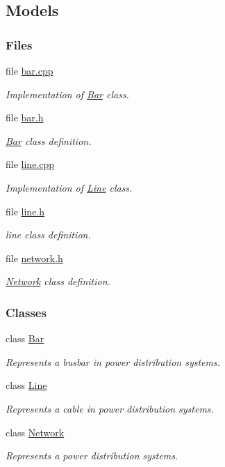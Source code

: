 \hypertarget{group___models}{}\subsection{Models}
\label{group___models}
\subsubsection*{Files}
\begin{DoxyCompactItemize}
\item 
file \hyperlink{bar_8cpp}{bar.\+cpp}
\begin{DoxyCompactList}\small\item\em Implementation of \hyperlink{class_bar}{Bar} class. \end{DoxyCompactList}\item 
file \hyperlink{bar_8h}{bar.\+h}
\begin{DoxyCompactList}\small\item\em \hyperlink{class_bar}{Bar} class definition. \end{DoxyCompactList}\item 
file \hyperlink{line_8cpp}{line.\+cpp}
\begin{DoxyCompactList}\small\item\em Implementation of \hyperlink{class_line}{Line} class. \end{DoxyCompactList}\item 
file \hyperlink{line_8h}{line.\+h}
\begin{DoxyCompactList}\small\item\em line class definition. \end{DoxyCompactList}\item 
file \hyperlink{network_8h}{network.\+h}
\begin{DoxyCompactList}\small\item\em \hyperlink{class_network}{Network} class definition. \end{DoxyCompactList}\end{DoxyCompactItemize}
\subsubsection*{Classes}
\begin{DoxyCompactItemize}
\item 
class \hyperlink{class_bar}{Bar}
\begin{DoxyCompactList}\small\item\em Represents a busbar in power distribution systems. \end{DoxyCompactList}\item 
class \hyperlink{class_line}{Line}
\begin{DoxyCompactList}\small\item\em Represents a cable in power distribution systems. \end{DoxyCompactList}\item 
class \hyperlink{class_network}{Network}
\begin{DoxyCompactList}\small\item\em Represents a power distribution systems. \end{DoxyCompactList}\end{DoxyCompactItemize}
